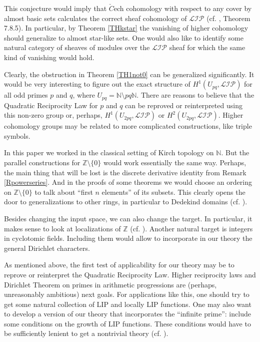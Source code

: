 \documentclass[10pt]{article}
\theoremstyle{definition}
\begin{document}
This conjecture would imply that $\check{C}$ech cohomology with respect to any cover by almost basic sets calculates the correct sheaf cohomology of $\mathcal{LIP}$ (cf. \cite{Taylor}, Theorem  7.8.5).  In particular, by Theorem \ref{THkstar} the vanishing of higher cohomology should generalize to almost star-like sets. One would also like to identify some natural category of  sheaves of modules over the $\mathcal{LIP}$ sheaf for which the same kind of vanishing would hold. 

Clearly, the obstruction in Theorem \ref{TH1not0} can be generalized significantly. It would be very interesting to figure out the exact structure of $H^1(U_{pq}, \mathcal{LIP})$ for all odd primes $p$ and $q$, where $U_{pq} = \mathbb N \setminus pq\mathbb N.$ There are reasons to believe that the Quadratic Reciprocity Law for $p$ and $q$ can be reproved or reinterpreted using this non-zero group or, perhaps, $H^1(U_{2pq}, \mathcal{LIP})$ or $H^2(U_{2pq}, \mathcal{LIP})$. Higher cohomology groups may be related to more complicated constructions, like triple symbols. 

In this paper we worked in the classical setting of Kirch topology on $\mathbb N.$ But the parallel constructions for $\mathbb Z \setminus \{0\}$ would work essentially the same way. Perhaps, the main thing that will be lost is the discrete derivative identity from Remark \ref{Rpowerseries}.  And in the proofs of some theorems we would choose an ordering on $\mathbb Z \setminus \{0\}$ to talk about ``first $n$ elements'' of its subsets. This clearly opens the door to generalizations to other rings, in particular to Dedekind domains (cf. \cite{Clarketal}).

Besides changing the input space, we can also change the target. In particular, it makes sense to look at localizations of $\mathbb Z$ (cf. \cite{MithunThesis}). Another natural target is integers in cyclotomic fields. Including them would allow to incorporate in our theory the general Dirichlet characters. 

As mentioned above, the first test of applicability for our theory may be to reprove or reinterpret the Quadratic Reciprocity Law. Higher reciprocity laws and Dirichlet Theorem on primes in arithmetic progressions are (perhaps, unreasonably ambitious) next goals. For applications like this, one should try to get some natural collection of LIP and locally LIP functions. One may also want to develop a version of our theory that incorporates the ``infinite prime'': include some conditions on the growth of LIP functions. These conditions would have to be sufficiently lenient to get a nontrivial theory (cf. \cite{LIP}).
\end{document}
